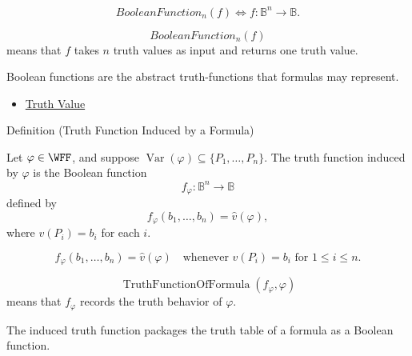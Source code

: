 \begin{remark*}
\[
BooleanFunction_n(f)
\Longleftrightarrow
f:\mathbb{B}^n\to\mathbb{B}.
\]
\end{remark*}

\begin{remark*}
\[
BooleanFunction_n(f)
\]
means that \(f\) takes \(n\) truth values as input and returns one truth value.
\end{remark*}

\begin{remark*}[Interpretation]
Boolean functions are the abstract truth-functions that formulas may represent.
\end{remark*}

\begin{dependencies}
\begin{itemize}
  \item \hyperref[def:truth-value-propositional-logic]{Truth Value}
\end{itemize}
\end{dependencies}
\begin{definitionbox}{Definition (Truth Function Induced by a Formula)}
\begin{definition}
\label{def:truth-function-induced-by-formula}
Let \(\varphi\in\WFF\), and suppose \(\operatorname{Var}(\varphi)\subseteq\{P_1,\ldots,P_n\}\). The truth function induced by \(\varphi\) is the Boolean function
\[
f_\varphi:\mathbb{B}^n\to\mathbb{B}
\]
defined by
\[
f_\varphi(b_1,\ldots,b_n)=\widehat v(\varphi),
\]
where \(v(P_i)=b_i\) for each \(i\).
\end{definition}
\end{definitionbox}

\begin{remark*}
\[
f_\varphi(b_1,\ldots,b_n)=\widehat v(\varphi)
\quad
\text{whenever }
v(P_i)=b_i\text{ for }1\le i\le n.
\]
\end{remark*}

\begin{remark*}
\[
\operatorname{TruthFunctionOfFormula}(f_\varphi,\varphi)
\]
means that \(f_\varphi\) records the truth behavior of \(\varphi\).
\end{remark*}

\begin{remark*}[Interpretation]
The induced truth function packages the truth table of a formula as a Boolean function.
\end{remark*}

